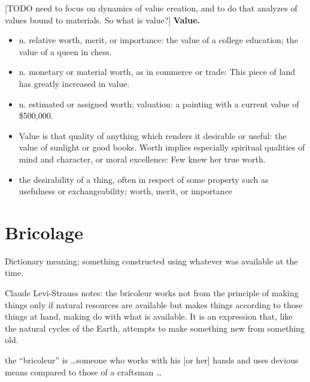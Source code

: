 [TODO need to focus on dynamics of value creation, and to do that analyzes of values bound to materials. So what is value?]
\textbf{Value.}
\begin{itemize}
\item n. relative worth, merit, or importance: the value of a college education; the value of a queen in chess.
\item n. monetary or material worth, as in commerce or trade: This piece of land has greatly increased in value.
\item n. estimated or assigned worth; valuation: a painting with a current value of \$500,000.
\item Value is that quality of anything which renders it desirable or useful: the value of sunlight or good books. Worth implies especially spiritual qualities of mind and character, or moral excellence: Few knew her true worth.
\item the desirability of a thing, often in respect of some property such as usefulness or exchangeability; worth, merit, or importance
\end{itemize}

\section{Bricolage}
Dictionary meaning; something constructed using whatever was available at the time.



Claude Levi-Strauss notes: the bricoleur works not from the principle of making things only if natural resources are available but makes things according to those things at hand, making do with what is available. It is an expression that, like the natural cycles of the Earth, attempts to make something new from something old. \cite{levi1966savage}

the “bricoleur” is \ldots someone who works with his [or her] hands and uses devious means compared to those of a craftsman \ldots \cite{levi1966savage}


